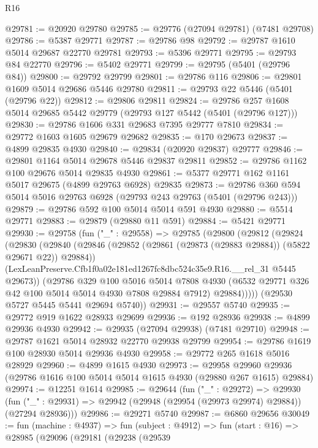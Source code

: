 \begin{lexlean}{R16}
\begin{coremodule}
@29781 := @20920 @29780
@29785 := @29776 (@27094 @29781) (@7481 @29708)
@29786 := @5387 @29771
@29787 := @29786 @98
@29792 := @29787 @1610 @5014 @29687 @22770 @29781
@29793 := @5396 @29771
@29795 := @29793 @84 @22770
@29796 := @5402 @29771
@29799 := @29795 (@5401 (@29796 @84))
@29800 := @29792 @29799
@29801 := @29786 @116
@29806 := @29801 @1609 @5014 @29686 @5446 @29780
@29811 := @29793 @22 @5446 (@5401 (@29796 @22))
@29812 := @29806 @29811
@29824 := @29786 @257 @1608 @5014 @29685 @5442 @29779 (@29793 @127 @5442 (@5401 (@29796 @127)))
@29830 := @29786 @1606 @331 @29683 @7395 @29777 @7810
@29834 := @29772 @1603 @1605 @29679 @29682
@29835 := @170 @29673
@29837 := @4899 @29835 @4930
@29840 := @29834 (@20920 @29837) @29777
@29846 := @29801 @1164 @5014 @29678 @5446 @29837 @29811
@29852 := @29786 @1162 @100 @29676 @5014 @29835 @4930
@29861 := @5377 @29771 @162 @1161 @5017 @29675 (@4899 @29763 @6928) @29835
@29873 := @29786 @360 @594 @5014 @5016 @29763 @6928 (@29793 @243 @29763 (@5401 (@29796 @243)))
@29879 := @29786 @592 @100 @5014 @5014 @591 @4930
@29880 := @5514 @29771
@29883 := @29879 (@29880 @11 @591)
@29884 := @5421 @29771
@29930 := @29758
    (fun ("_" : @29558) =>
    @29785
      (@29800
        (@29812
          (@29824
            (@29830
              (@29840
                (@29846 (@29852 (@29861 (@29873 (@29883 @29884)) (@5822 @29671 @22)) @29884))
                (LexLeanPreserve.Cfb1f0a02e181ed1267fc8dbc524c35e9.R16.__rel_31 @5445 @29673))
              (@29786
                @329
                @100
                @5016
                @5014
                @7808
                @4930
                (@6532 @29771 @326 @42 @100 @5014 @5014 @4930 @7808 @29884 @7912)
                @29884)))))
      (@29530 @5727 @5445 @5441 @29694 @5740))
@29931 := @29557 @5740
@29935 := @29772 @919 @1622 @28933 @29699
@29936 := @192 @28936
@29938 := @4899 @29936 @4930
@29942 := @29935 (@27094 @29938) (@7481 @29710)
@29948 := @29787 @1621 @5014 @28932 @22770 @29938 @29799
@29954 := @29786 @1619 @100 @28930 @5014 @29936 @4930
@29958 := @29772 @265 @1618 @5016 @28929
@29960 := @4899 @1615 @4930
@29973 := @29958
    @29960
    @29936
    (@29786 @1616 @100 @5014 @5014 @1615 @4930 (@29880 @267 @1615) @29884)
@29974 := @12251 @1614
@29985 := @29644
    (fun ("_" : @29272) =>
    @29930 (fun ("_" : @29931) => @29942 (@29948 (@29954 (@29973 @29974) @29884)) (@27294 @28936)))
@29986 := @29271 @5740
@29987 := @6860 @29656
@30049 := fun (machine : @4937) =>
  fun (subject : @4912) =>
  fun (start : @16) =>
  @28985
    (@29096
      (@29181
        (@29238
          (@29539

\end{coremodule}
\end{lexlean}
